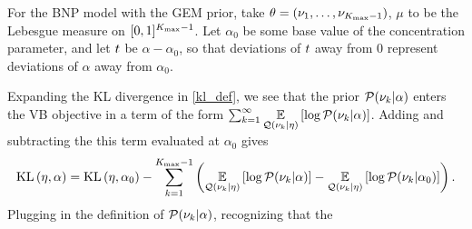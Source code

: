 \begin{ex}
%
For the BNP model with the GEM prior, take $\theta = (\nu_1, \ldots,
\nu_{{K_{\mathrm{max}}}-1})$, $\mu$ to be the Lebesgue measure on $[0,1]^{{K_{\mathrm{max}}}-1}$.
Let $\alpha_0$ be some base value of the concentration parameter, and
let $t$ be $\alpha - \alpha_0$, so that deviations of $t$ away from
$0$ represent deviations of $\alpha$ away from $\alpha_0$.

Expanding the KL divergence in \eqref{kl_def}, we see that the prior
$\mathcal{P}(\nu_{k} \vert \alpha)$ enters the VB objective in a term of the form
$\sum_{k=1}^\infty \underset{\mathcal{Q}(\nu_{k} \vert \eta)}{\mathbb{E}}\left[\log \mathcal{P}(\nu_{k} \vert \alpha)\right]$.
Adding and subtracting the this term evaluated at $\alpha_0$ gives
%
\begin{align*}
%
\KL{\eta, \alpha} = \KL{\eta, \alpha_0}
-\sum_{\k=1}^{\kmax - 1}
            \left(
                \expect{\q(\nuk \vert \eta)}{\log \p(\nuk \vert \alpha)} -
                \expect{\q(\nuk \vert \eta)}{\log \p(\nuk \vert \alpha_0)}
             \right).
%
\end{align*}
%
Plugging in the definition of $\mathcal{P}(\nu_{k} \vert \alpha)$, recognizing that the

\end{ex}
